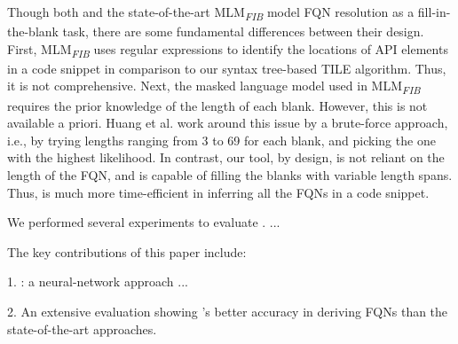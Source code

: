 Though both \tool and the state-of-the-art MLM\textsubscript{\textit{FIB}} model FQN resolution as a fill-in-the-blank task, there are some fundamental differences between their design. First, MLM\textsubscript{\textit{FIB}} uses regular expressions to identify the locations of API elements in a code snippet in comparison to our syntax tree-based TILE algorithm. Thus, it is not comprehensive. Next, the masked language model used in MLM\textsubscript{\textit{FIB}} requires the prior knowledge of the length of each blank. However, this is not available a priori. Huang et al. work around this issue by a brute-force approach, i.e., by trying lengths ranging from 3 to 69 for each blank, and picking the one with the highest likelihood. In contrast, our tool, by design, is not reliant on the length of the FQN, and is capable of filling the blanks with variable length spans. Thus, \tool is much more time-efficient in inferring all the FQNs in a code snippet.


We performed several experiments to evaluate {\tool}. ...

The key contributions of this paper include:

1. {\tool}: a neural-network approach ...

2. An extensive evaluation showing {\tool}'s better accuracy in
deriving FQNs than the state-of-the-art approaches.
